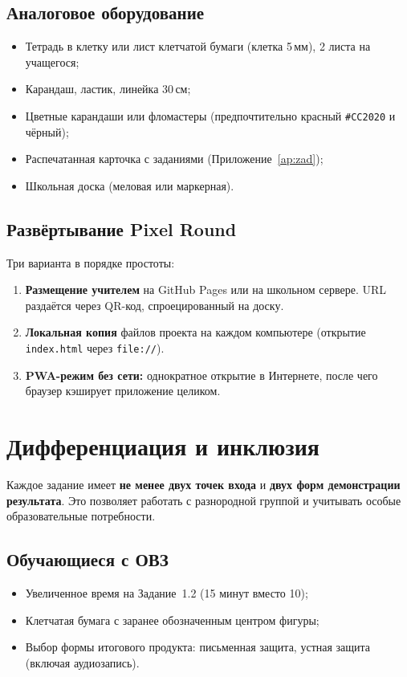 \documentclass[12pt,a4paper]{scrartcl}
\newcommand{\acc}[1]{\textcolor{accent}{\textbf{#1}}}
\begin{document}
\subsection{Аналоговое оборудование}
\begin{itemize}[leftmargin=1.3em,itemsep=0.15em,topsep=0.3em]
  \item Тетрадь в клетку или лист клетчатой бумаги (клетка 5\,мм), 2 листа на учащегося;
  \item Карандаш, ластик, линейка 30\,см;
  \item Цветные карандаши или фломастеры (предпочтительно красный \texttt{\#CC2020} и чёрный);
  \item Распечатанная карточка с заданиями (Приложение~\ref{ap:zad});
  \item Школьная доска (меловая или маркерная).
\end{itemize}

\subsection{Развёртывание Pixel Round}

Три варианта в порядке простоты:

\begin{enumerate}[leftmargin=1.5em,itemsep=0.15em,topsep=0.3em]
  \item \textbf{Размещение учителем} на GitHub Pages или на школьном сервере. URL раздаётся через QR-код, спроецированный на доску.
  \item \textbf{Локальная копия} файлов проекта на каждом компьютере (открытие \texttt{index.html} через \texttt{file://}).
  \item \textbf{PWA-режим без сети:} однократное открытие в Интернете, после чего браузер кэширует приложение целиком.
\end{enumerate}

\section{Дифференциация и инклюзия}\label{sec:diff}

Каждое задание имеет \acc{не менее двух точек входа} и \acc{двух форм демонстрации результата}. Это позволяет работать с разнородной группой и учитывать особые образовательные потребности.

\subsection{Обучающиеся с ОВЗ}
\begin{itemize}[leftmargin=1.3em,itemsep=0.15em,topsep=0.3em]
  \item Увеличенное время на Задание~1.2 (15 минут вместо 10);
  \item Клетчатая бумага с заранее обозначенным центром фигуры;
  \item Выбор формы итогового продукта: письменная защита, устная защита (включая аудиозапись).
\end{itemize}
\end{document}
